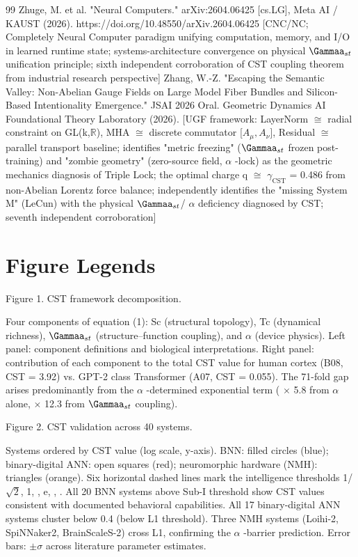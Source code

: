 \documentclass[a4paper,12pt]{article}
\begin{document}
\begin{thebibliography}{99}
 Zhuge, M. et al. "Neural Computers." arXiv:2604.06425 [cs.LG], Meta AI / KAUST (2026). https://doi.org/10.48550/arXiv.2604.06425 [CNC/NC; Completely Neural Computer paradigm unifying computation, memory, and I/O in learned runtime state; systems-architecture convergence on physical $\Gammaa_{st}$ unification principle; sixth independent corroboration of CST coupling theorem from industrial research perspective]
 Zhang, W.-Z. "Escaping the Semantic Valley: Non-Abelian Gauge Fields on Large Model Fiber Bundles and Silicon-Based Intentionality Emergence." JSAI 2026 Oral.
Geometric Dynamics AI Foundational Theory Laboratory (2026). [UGF framework: LayerNorm $\cong$ radial constraint on GL(k,$\mathbb{R}$), MHA $\cong$ discrete commutator [$A_{\mu}, A_{\nu}$], Residual $\cong$ parallel transport baseline; identifies "metric freezing" ($\Gammaa_{st}$ frozen post-training) and "zombie geometry" (zero-source field,  $\alpha$ -lock) as the geometric mechanics diagnosis of Triple Lock; the optimal charge q
$\cong$ $\gamma_{\text{CST}}$ = 0.486 from non-Abelian Lorentz force balance; independently identifies the "missing System M" (LeCun) with the physical $\Gammaa_{st}$/ $\alpha$  deficiency diagnosed by CST; seventh independent corroboration]
\end{thebibliography}

\section*{Figure Legends}
Figure 1. CST framework decomposition.

Four components of equation (1): Sc (structural topology), Tc (dynamical richness), $\Gammaa_{st}$ (structure--function coupling), and  $\alpha$  (device physics).
Left panel: component definitions and biological interpretations.
Right panel: contribution of each component to the total CST value for human cortex (B08, CST = 3.92) vs.
GPT-2 class Transformer (A07, CST = 0.055).
The 71-fold gap arises predominantly from the  $\alpha$ -determined exponential term ( $\times$ 5.8 from  $\alpha$  alone,  $\times$ 12.3 from $\Gammaa_{st}$ coupling).

Figure 2. CST validation across 40 systems.

Systems ordered by CST value (log scale, y-axis).
BNN: filled circles (blue); binary-digital ANN: open squares (red); neuromorphic hardware (NMH): triangles (orange).
Six horizontal dashed lines mark the intelligence thresholds {1/$\sqrt{2}$, 1,  \phi , e,  \pi ,  \delta }.
All 20 BNN systems above Sub-I threshold show CST values consistent with documented behavioral capabilities.
All 17 binary-digital ANN systems cluster below 0.4 (below L1 threshold).
Three NMH systems (Loihi-2, SpiNNaker2, BrainScaleS-2) cross L1, confirming the  $\alpha$ -barrier prediction.
Error bars: $\pm\sigma$ across literature parameter estimates.
\end{document}
